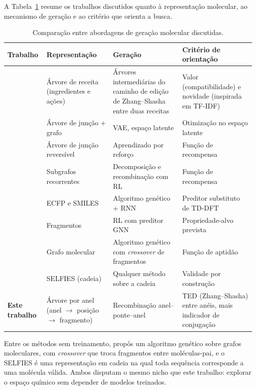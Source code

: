 A Tabela~\ref{tab:comparativo} resume os trabalhos discutidos quanto à representação molecular, ao mecanismo de geração e ao critério que orienta a busca.

\begin{table}[htb]
	\centering
	\caption{Comparação entre abordagens de geração molecular discutidas.}
	\label{tab:comparativo}
	\footnotesize
	\begin{tabular}{p{3.2cm}p{3.4cm}p{3.6cm}p{4.2cm}}
		\hline
		\textbf{Trabalho} & \textbf{Representação} & \textbf{Geração} & \textbf{Critério de orientação} \\
		\hline
		\citeonline{cooking_2025} & Árvore de receita (ingredientes e ações) & Árvores intermediárias do caminho de edição de Zhang--Shasha entre duas receitas & Valor (compatibilidade) e novidade (inspirada em TF-IDF) \\
		\citeonline{jin_2018} & Árvore de junção + grafo & VAE, espaço latente & Otimização no espaço latente \\
		\citeonline{ishitani_2022} & Árvore de junção reversível & Aprendizado por reforço & Função de recompensa \\
		\citeonline{yamada_2023} & Subgrafos recorrentes & Decomposição e recombinação com RL & Função de recompensa \\
		\citeonline{kwon_2021} & ECFP e SMILES & Algoritmo genético + RNN & Preditor substituto de TD-DFT \\
		\citeonline{worakul_2025} & Fragmentos & RL com preditor GNN & Propriedade-alvo prevista \\
		\citeonline{jensen_2019} & Grafo molecular & Algoritmo genético com \textit{crossover} de fragmentos & Função de aptidão \\
		\citeonline{krenn_2020} & SELFIES (cadeia) & Qualquer método sobre a cadeia & Validade por construção \\
		\textbf{Este trabalho} & Árvore por anel (anel $\rightarrow$ posição $\rightarrow$ fragmento) & Recombinação anel--ponte--anel & TED (Zhang--Shasha) entre anéis, mais indicador de conjugação \\
		\hline
	\end{tabular}
\end{table}

Entre os métodos sem treinamento,  propôs um algoritmo genético sobre grafos moleculares, com \textit{crossover} que troca fragmentos entre moléculas-pai, e o SELFIES \cite{krenn_2020} é uma representação em cadeia na qual toda sequência corresponde a uma molécula válida. Ambos disputam o mesmo nicho que este trabalho: explorar o espaço químico sem depender de modelos treinados.

